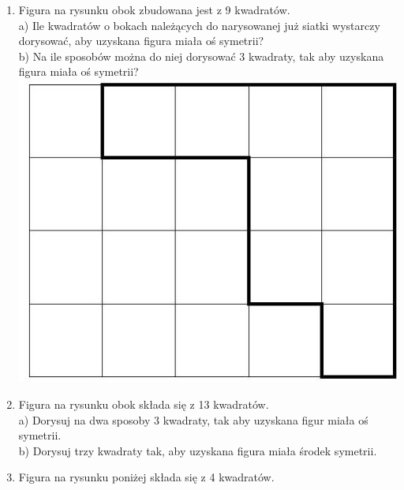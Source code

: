 \documentclass[10pt]{article}
\begin{document}
\begin{enumerate}
  \item Figura na rysunku obok zbudowana jest z 9 kwadratów.\\
a) Ile kwadratów o bokach należących do narysowanej już siatki wystarczy dorysować, aby uzyskana figura miała oś symetrii?\\
b) Na ile sposobów można do niej dorysować 3 kwadraty, tak aby uzyskana figura miała oś symetrii?\\
\includegraphics[max width=\textwidth, center]{2024_11_21_71f62bd117d375398909g-205(1)}
  \item Figura na rysunku obok składa się z 13 kwadratów.\\
a) Dorysuj na dwa sposoby 3 kwadraty, tak aby uzyskana figur miała oś symetrii.\\
b) Dorysuj trzy kwadraty tak, aby uzyskana figura miała środek symetrii.
  \item Figura na rysunku poniżej składa się z 4 kwadratów.\\

\end{enumerate}
\end{document}
